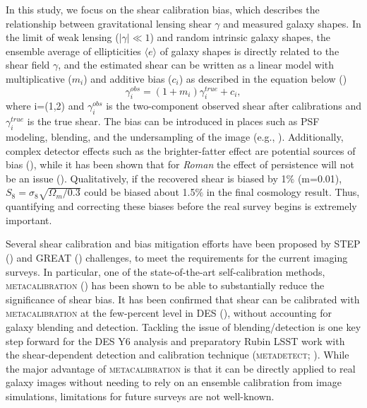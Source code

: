\documentclass[fleqn,usenatbib]{mnras}
\begin{document}
In this study, we focus on the shear calibration bias, which describes the relationship between gravitational lensing shear $\gamma$ and measured galaxy shapes. In the limit of weak lensing ($\lvert\gamma\rvert\ll1$) and random intrinsic galaxy shapes, the ensemble average of ellipticities $\langle e \rangle$ of galaxy shapes is directly related to the shear field $\gamma$, and the estimated shear can be written as a linear model with multiplicative ($m_{i}$) and additive bias ($c_{i}$) as described in the equation below (\citealt{2006MNRAS.368.1323H, 2006MNRAS.366..101H, 2007MNRAS.376...13M}) 
\begin{equation}
    \gamma^{obs}_{i} = (1+m_{i})\gamma^{true}_{i} + c_{i}, 
    \label{eqn:linear}
\end{equation}
where i=(1,2) and $\gamma^{obs}_{i}$ is the two-component observed shear after calibrations and $\gamma^{true}_{i}$ is the true shear. The bias can be introduced in places such as PSF modeling, blending, and the undersampling of the image (e.g., \citealt{2018ARA&A..56..393M}). Additionally, complex detector effects such as the brighter-fatter effect are potential sources of bias (\citealt{2013MNRAS.429..661M}), while it has been shown that for \emph{Roman} the effect of persistence will not be an issue (\citealt{2021arXiv210610273L}). Qualitatively, if the recovered shear is biased by 1$\%$ (m=0.01), $S_{8} = \sigma_{8} \sqrt{\Omega_{m}/0.3}$ could be biased about 1.5$\%$ in the final cosmology result. Thus, quantifying and correcting these biases before the real survey begins is extremely important. \par

Several shear calibration and bias mitigation efforts have been proposed by STEP (\citealt{2006MNRAS.368.1323H, 2007MNRAS.376...13M}) and GREAT (\citealt{2010MNRAS.405.2044B, 2013ApJS..205...12K, 2015MNRAS.450.2963M}) challenges, to meet the requirements for the current imaging surveys. In particular, one of the state-of-the-art self-calibration methods, \textsc{metacalibration} (\citealt{2017arXiv170202600H, 2017ApJ...841...24S}) has been shown to be able to substantially reduce the significance of shear bias. It has been confirmed that shear can be calibrated with \textsc{metacalibration} at the few-percent level in DES (\citealt{2018MNRAS.481.1149Z, 2020arXiv201103408G}), without accounting for galaxy blending and detection. Tackling the issue of blending/detection is one key step forward for the DES Y6 analysis and preparatory Rubin LSST work with the shear-dependent detection and calibration technique (\textsc{metadetect}; \citealt{2020ApJ...902..138S}). While the major advantage of \textsc{metacalibration} is that it can be directly applied to real galaxy images without needing to rely on an ensemble calibration from image simulations, limitations for future surveys are not well-known. 
\end{document}
